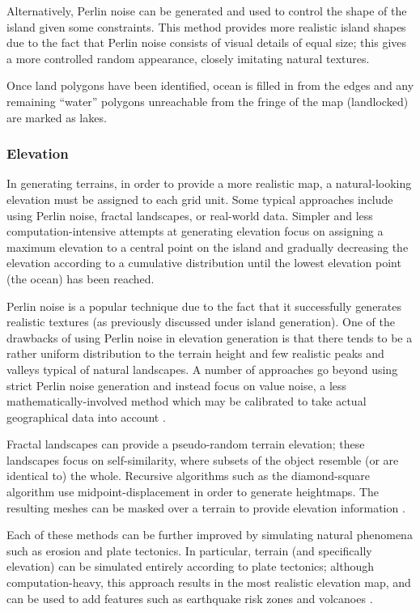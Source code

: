 Alternatively, Perlin noise can be generated and used to control the shape of the island given some constraints. This method provides more realistic island shapes due to the fact that Perlin noise consists of visual details of equal size; this gives a more controlled random appearance, closely imitating natural textures. 

Once land polygons have been identified, ocean is filled in from the edges and any remaining ``water'' polygons unreachable from the fringe of the map (landlocked) are marked as lakes. 

\subsubsection{Elevation}
In generating terrains, in order to provide a more realistic map, a natural-looking elevation must be assigned to each grid unit. Some typical approaches include using Perlin noise, fractal landscapes, or real-world data. Simpler and less computation-intensive attempts at generating elevation focus on assigning a maximum elevation to a central point on the island and gradually decreasing the elevation according to a cumulative distribution until the lowest elevation point (the ocean) has been reached\cite{Patel:2010:Online}.

Perlin noise is a popular technique due to the fact that it successfully generates  realistic textures (as previously discussed under island generation). One of the drawbacks of using Perlin noise in elevation generation is that there tends to be a rather uniform distribution to the terrain height and few realistic peaks and valleys typical of natural landscapes. A number of approaches go beyond using strict Perlin noise generation and instead focus on value noise, a less mathematically-involved method which may be calibrated to take actual geographical data into account \cite{Parberry:2014}. 

Fractal landscapes can provide a pseudo-random terrain elevation; these landscapes focus on self-similarity, where subsets of the object resemble (or are identical to) the whole. Recursive algorithms such as the diamond-square algorithm use midpoint-displacement in order to generate heightmaps. The resulting meshes can be masked over a terrain to provide elevation information \cite{Martz:1997:Online}. 

Each of these methods can be further improved by simulating natural phenomena such as erosion and plate tectonics. In particular, terrain (and specifically elevation) can be simulated entirely according to plate tectonics; although computation-heavy, this approach results in the most realistic elevation map, and can be used to add features such as earthquake risk zones and volcanoes \cite{Key}.

